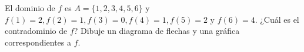 \setcounter{enumi}{8}
    \item El dominio de $f$ es $A = \{1, 2, 3, 4, 5, 6\}$ y $f(1) = 2, f(2) = 1, f(3) = 0, f(4) = 1, f(5) = 2 \text{ y } f(6) = 4$. ¿Cuál es el contradominio de $f$? Dibuje un diagrama de flechas y una gráfica correspondientes a $f$.
